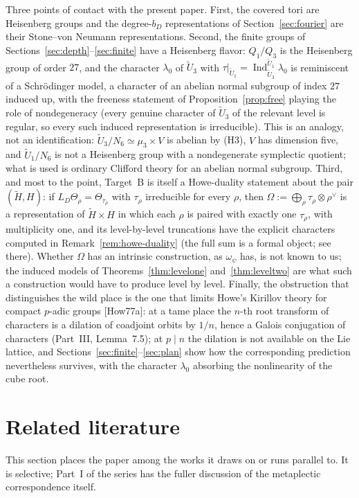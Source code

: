 \documentclass[11pt]{article}
\newcommand{\Ind}{\operatorname{Ind}}
\newcommand{\tH}{\widetilde H}
\newcommand{\tU}{\widetilde U}
\theoremstyle{plain}
\theoremstyle{definition}
\begin{document}
Three points of contact with the present paper.  First, the covered
tori are Heisenberg groups and the degree-$b_D$ representations of
Section~\ref{sec:fourier} are their Stone--von Neumann representations.
Second, the finite groups of Sections~\ref{sec:depth}--\ref{sec:finite}
have a Heisenberg flavor: $Q_1/Q_3$ is the Heisenberg group of order
$27$, and the character $\lambda_0$ of $\tU_3$ with
$\tau|_{\tU_1}=\Ind_{\tU_3}^{\tU_1}\lambda_0$ is reminiscent of a
Schr\"odinger model, a character of an abelian normal subgroup of index
$27$ induced up, with the freeness statement of
Proposition~\ref{prop:free} playing the role of nondegeneracy (every
genuine character of $\tU_3$ of the relevant level is regular, so every
such induced representation is irreducible).  This is an analogy, not an
identification: $\tU_3/N_6\simeq\mu_3\times V$ is abelian by (H3), $V$
has dimension five, and $\tU_1/N_6$ is not a Heisenberg group with a
nondegenerate symplectic quotient; what is used is ordinary Clifford
theory for an abelian normal subgroup.  Third, and most
to the point, Target~B is itself a Howe-duality statement about the pair
$(\tH,H)$: if $L_D\Theta_\rho=\Theta_{\tau_\rho}$ with $\tau_\rho$
irreducible for every $\rho$, then $\Omega:=\bigoplus_\rho\tau_\rho\otimes\rho^\vee$
is a representation of $\tH\times H$ in which each $\rho$ is paired
with exactly one $\tau_\rho$, with multiplicity one, and its
level-by-level truncations have the explicit characters computed in
Remark~\ref{rem:howe-duality} (the full sum is a formal object; see
there).
Whether $\Omega$ has an intrinsic construction, as $\omega_\psi$ has,
is not known to us; the induced models of
Theorems~\ref{thm:levelone} and~\ref{thm:leveltwo} are what such a
construction would have to produce level by level.  Finally, the
obstruction that distinguishes the wild place is the one that limits
Howe's Kirillov theory for compact $p$-adic groups [How77a]: at a tame
place the $n$-th root transform of characters is a dilation of coadjoint
orbits by $1/n$, hence a Galois conjugation of characters (Part~III,
Lemma~7.5); at $p\mid n$ the dilation is not available on the Lie
lattice, and Sections~\ref{sec:finite}--\ref{sec:plan} show how the
corresponding prediction nevertheless survives, with the character
$\lambda_0$ absorbing the nonlinearity of the cube root.

\section{Related literature}\label{sec:literature}
This section places the paper among the works it draws on or runs
parallel to.  It is selective; Part~I of the series has the fuller
discussion of the metaplectic correspondence itself.
\end{document}
